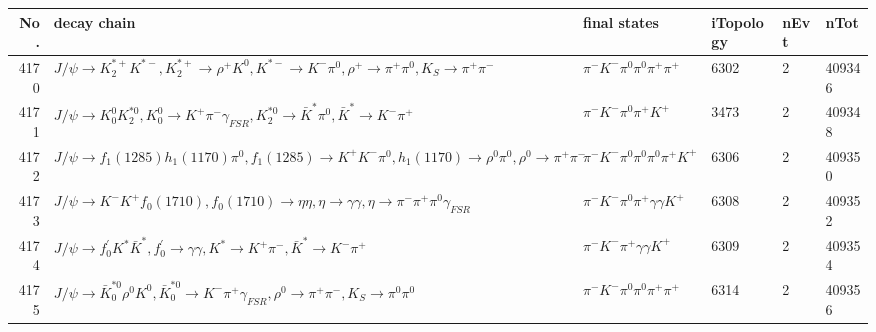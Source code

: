 \begin{table}[htbp] 
\begin{center}
\begin{small}
\begin{tabular}{rlllll}\hline\hline
 No. & decay chain & final states &  iTopology & nEvt & nTot \\\hline
4170&$J/\psi       \rightarrow K_2^{*+}       K^{*-}         , K_2^{*+}        \rightarrow \rho^{+}      K^{0}          , K^{*-}          \rightarrow K^{-}          \pi^{0}        , \rho^{+}       \rightarrow \pi^{+}        \pi^{0}        , K_{S}           \rightarrow \pi^{+}        \pi^{-}        $&$\pi^{-}        K^{-}          \pi^{0}        \pi^{0}        \pi^{+}        \pi^{+}        $& 6302&    2&409346\\
4171&$J/\psi       \rightarrow K_0^{0}        K_2^{*0}       , K_0^{0}         \rightarrow K^{+}          \pi^{-}        \gamma_{FSR} , K_2^{*0}        \rightarrow \bar{K}^{*}   \pi^{0}        , \bar{K}^{*}    \rightarrow K^{-}          \pi^{+}        $&$\pi^{-}        K^{-}          \pi^{0}        \pi^{+}        K^{+}          $& 3473&    2&409348\\
4172&$J/\psi       \rightarrow f_{1}(1285)    h_{1}(1170)    \pi^{0}        , f_{1}(1285)     \rightarrow K^{+}          K^{-}          \pi^{0}        , h_{1}(1170)     \rightarrow \rho^{0}      \pi^{0}        , \rho^{0}       \rightarrow \pi^{+}        \pi^{-}        $&$\pi^{-}        K^{-}          \pi^{0}        \pi^{0}        \pi^{0}        \pi^{+}        K^{+}          $& 6306&    2&409350\\
4173&$J/\psi       \rightarrow K^{-}          K^{+}          f_{0}(1710)    , f_{0}(1710)     \rightarrow \eta          \eta          , \eta           \rightarrow \gamma       \gamma       , \eta           \rightarrow \pi^{-}        \pi^{+}        \pi^{0}        \gamma_{FSR} $&$\pi^{-}        K^{-}          \pi^{0}        \pi^{+}        \gamma       \gamma       K^{+}          $& 6308&    2&409352\\
4174&$J/\psi       \rightarrow f^{'}_{0}     K^{*}          \bar{K}^{*}   , f^{'}_{0}      \rightarrow \gamma       \gamma       , K^{*}           \rightarrow K^{+}          \pi^{-}        , \bar{K}^{*}    \rightarrow K^{-}          \pi^{+}        $&$\pi^{-}        K^{-}          \pi^{+}        \gamma       \gamma       K^{+}          $& 6309&    2&409354\\
4175&$J/\psi       \rightarrow \bar{K}_0^{*0}\rho^{0}      K^{0}          , \bar{K}_0^{*0} \rightarrow K^{-}          \pi^{+}        \gamma_{FSR} , \rho^{0}       \rightarrow \pi^{+}        \pi^{-}        , K_{S}           \rightarrow \pi^{0}        \pi^{0}        $&$\pi^{-}        K^{-}          \pi^{0}        \pi^{0}        \pi^{+}        \pi^{+}        $& 6314&    2&409356\\

\end{tabular}
\end{small}
\end{center}
\end{table}
